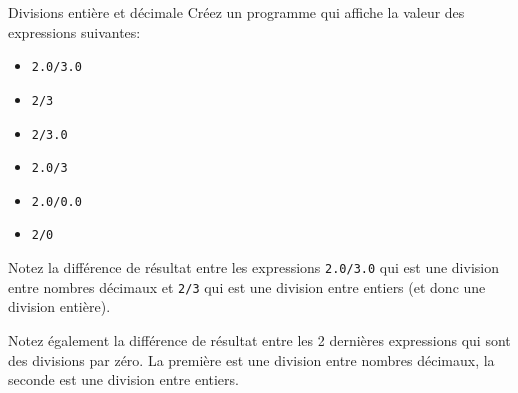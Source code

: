 \documentclass[a4paper,11pt]{article}
\begin{document}
	\begin{Exercice}{Divisions entière et décimale}
		Créez un programme qui affiche la valeur des expressions suivantes:
	
		\begin{itemize}		
			\item \texttt{2.0/3.0}
			\item \texttt{2/3}
			\item \texttt{2/3.0}
			\item \texttt{2.0/3}
			\item \texttt{2.0/0.0}
			\item \texttt{2/0}
		\end{itemize}
	
		Notez la différence de résultat entre les expressions \texttt{2.0/3.0} qui est une division entre nombres décimaux 
		et \texttt{2/3} qui est une division entre entiers (et donc une division entière).
	
		Notez également la différence de résultat entre les 2 dernières expressions qui sont des divisions par zéro.
		La première est une division entre nombres décimaux,
		la seconde est une division entre entiers.
	\end{Exercice}
%
\end{document}
